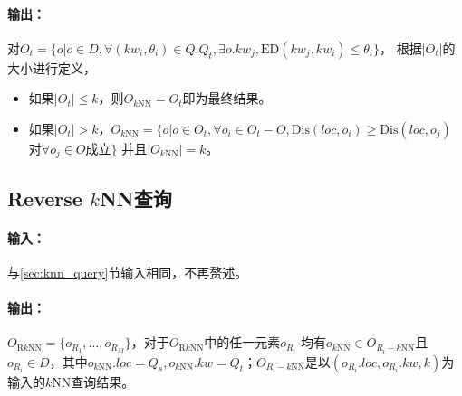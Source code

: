 \documentclass{ML}
\begin{document}
\paragraph{输出：}对$O_t = \{o | o \in D, \forall(kw_i, \theta_i) \in Q.Q_t, \exists o.kw_j, \mathrm{ED}(kw_j, kw_i) \leq \theta_i\}$，
根据$|O_t|$的大小进行定义，
\begin{itemize}
    \item 如果$|O_t| \leq k$，则$O_{k\mathrm{NN}} = O_t$即为最终结果。
    \item 如果$|O_t| > k$，$O_{k\mathrm{NN}}= \{o | o \in O_t, \forall o_i \in O_t - O, \mathrm{Dis}(loc, o_i) \ge \mathrm{Dis}(loc, o_j)$对$\forall o_j \in O$成立$\}$
    并且$|O_{k\mathrm{NN}}| = k$。
\end{itemize}

\subsection{Reverse $k$NN查询}\label{sec:RkNN-query}
\paragraph{输入：}与\ref{sec:knn_query}节输入相同，不再赘述。
\paragraph{输出：}$O_{\mathrm{R}k\mathrm{NN}} = \{o_{R_1}, \dots, o_{R_M}\}$，对于$O_{\mathrm{R}k\mathrm{NN}}$中的任一元素$o_{R_i}$
均有$o_{k\mathrm{NN}} \in O_{R_i-k\mathrm{NN}}$且$o_{R_i} \in D$，其中$o_{k\mathrm{NN}}.loc = Q_s, o_{k\mathrm{NN}}.kw = Q_t$；$O_{R_i-k\mathrm{NN}}$是以$(o_{R_i}.loc, o_{R_i}.kw, k)$为输入的$k$NN查询结果。

\end{document}
